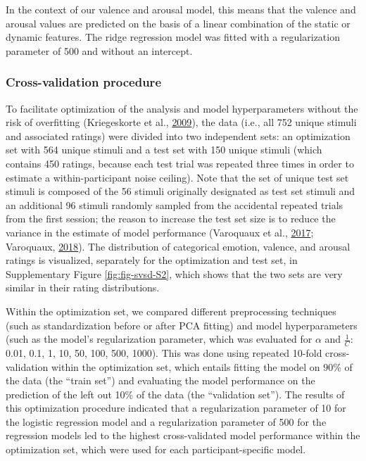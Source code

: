 \documentclass[11pt,american,a4paper,oneside,]{memoir} %
\begin{document}
In the context of our valence and arousal model, this means that the valence and arousal values are predicted on the basis of a linear combination of the static or dynamic features. The ridge regression model was fitted with a regularization parameter of 500 and without an intercept.

\hypertarget{svsd-cv}{%
\subsubsection{Cross-validation procedure}\label{svsd-cv}}

To facilitate optimization of the analysis and model hyperparameters without the risk of overfitting (Kriegeskorte et al., \protect\hyperlink{ref-kriegeskorte2009circular}{2009}), the data (i.e., all 752 unique stimuli and associated ratings) were divided into two independent sets: an optimization set with 564 unique stimuli and a test set with 150 unique stimuli (which contains 450 ratings, because each test trial was repeated three times in order to estimate a within-participant noise ceiling). Note that the set of unique test set stimuli is composed of the 56 stimuli originally designated as test set stimuli and an additional 96 stimuli randomly sampled from the accidental repeated trials from the first session; the reason to increase the test set size is to reduce the variance in the estimate of model performance (Varoquaux et al., \protect\hyperlink{ref-Varoquaux2017-fj}{2017}; Varoquaux, \protect\hyperlink{ref-Varoquaux2018-uo}{2018}). The distribution of categorical emotion, valence, and arousal ratings is visualized, separately for the optimization and test set, in Supplementary Figure \ref{fig:fig-svsd-S2}, which shows that the two sets are very similar in their rating distributions.

Within the optimization set, we compared different preprocessing techniques (such as standardization before or after PCA fitting) and model hyperparameters (such as the model's regularization parameter, which was evaluated for \(\alpha\) and \(\frac{1}{C}\): 0.01, 0.1, 1, 10, 50, 100, 500, 1000). This was done using repeated 10-fold cross-validation within the optimization set, which entails fitting the model on 90\% of the data (the ``train set'') and evaluating the model performance on the prediction of the left out 10\% of the data (the ``validation set''). The results of this optimization procedure indicated that a regularization parameter of 10 for the logistic regression model and a regularization parameter of 500 for the regression models led to the highest cross-validated model performance within the optimization set, which were used for each participant-specific model.
\end{document}
